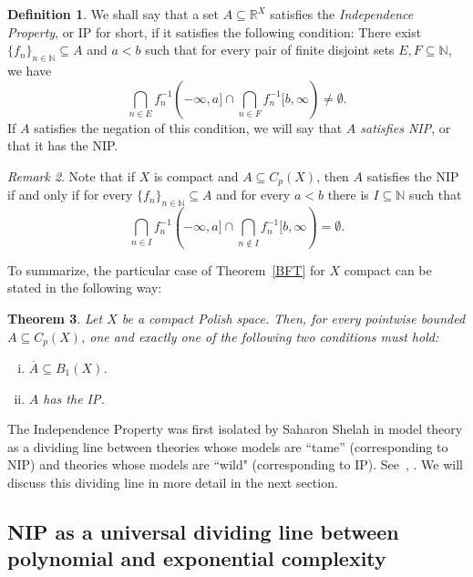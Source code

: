 \documentclass[psamsfonts]{amsart}
\newtheorem{thm}{Theorem}[section]
\theoremstyle{definition}
\newtheorem{defn}[thm]{Definition}
\theoremstyle{remark}
\newtheorem{rem}[thm]{Remark}
\numberwithin{equation}{section}
\begin{document}
\begin{defn}
    We shall say that a set $A\subseteq \mathbb{R}^X$ satisfies the \emph{Independence Property}, or IP for short, if it satisfies the following condition:
    There exist $\{f_n\}_{n\in\mathbb{N}}\subseteq A$ and  $a<b$ such that for every pair of finite disjoint sets $E,F\subseteq\mathbb{N}$, we have
    \[
    \bigcap_{n\in E}f_n^{-1}(-\infty,a]\cap\bigcap_{n\in F}f_n^{-1}[b,\infty)\neq\emptyset.
    \]
    If $A$ satisfies the negation of this condition, we will say that \emph{$A$ satisfies NIP}, or that it has the NIP.
\end{defn}

\begin{rem}
Note that if $X$ is compact and $A\subseteq C_p(X)$, then $A$ satisfies the NIP if and only if for every $\{f_n\}_{n\in\mathbb{N}}\subseteq A$ and for every $a<b$ there is $I\subseteq\mathbb{N}$ such that
$$\bigcap_{n\in I}f_n^{-1}(-\infty,a]\cap\bigcap_{n\notin I}f_n^{-1}[b,\infty)=\emptyset.$$
\end{rem}


To summarize, the particular case of Theorem~\ref{BFT}  for $X$ compact can be stated in the following way:


\begin{thm}
\label{BFT2}
    Let $X$ be a compact Polish space.
Then, for every pointwise bounded  $A\subseteq C_p(X)$, one and exactly one of the following two conditions must hold:
        \begin{enumerate}[(i)]
        \item $\overline{A}\subseteq B_1(X)$.
        \item $A$ has the IP.
    \end{enumerate}
\end{thm}



The Independence Property was first isolated by Saharon Shelah in model theory as a dividing line between theories whose models are ``tame'' (corresponding to NIP) and theories whose models are ``wild" (corresponding to IP).
See~\cite[Definition 4.1]{Shelah:1971}, \cite{Shelah:1990}.
We will discuss this dividing line in more detail in the next section.


\subsection{NIP as a universal dividing line between polynomial and exponential complexity}
\end{document}
